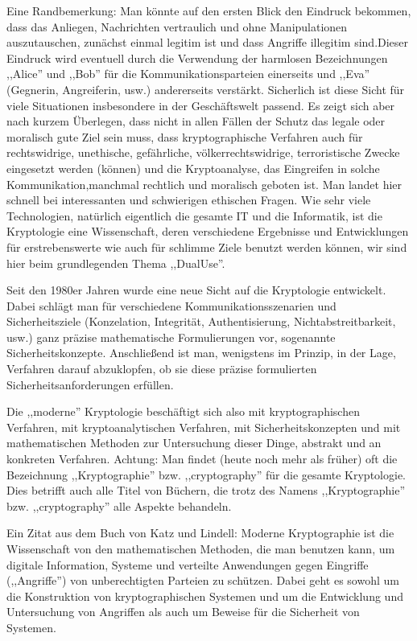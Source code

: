 \documentclass[a4paper]{article}
\begin{document}
\begin{multicols}{3}
Eine Randbemerkung: Man könnte auf den ersten Blick den Eindruck bekommen, dass das Anliegen,  Nachrichten vertraulich und ohne Manipulationen auszutauschen, zunächst einmal legitim ist und dass Angriffe illegitim sind.Dieser Eindruck wird eventuell durch die Verwendung der harmlosen Bezeichnungen ,,Alice'' und ,,Bob'' für die Kommunikationsparteien einerseits und ,,Eva'' (Gegnerin, Angreiferin, usw.) andererseits verstärkt. Sicherlich ist diese Sicht für viele Situationen insbesondere in der Geschäftswelt passend. Es zeigt sich aber nach kurzem Überlegen, dass nicht in allen Fällen der Schutz das legale oder moralisch gute Ziel sein muss, dass kryptographische Verfahren auch für rechtswidrige, unethische, gefährliche, völkerrechtswidrige, terroristische Zwecke eingesetzt werden (können) und die Kryptoanalyse, das Eingreifen in solche Kommunikation,manchmal rechtlich und moralisch geboten ist. Man landet hier schnell bei interessanten und schwierigen ethischen Fragen. Wie sehr viele Technologien, natürlich eigentlich die gesamte IT und die Informatik, ist die Kryptologie eine Wissenschaft, deren verschiedene Ergebnisse und Entwicklungen für erstrebenswerte wie auch für schlimme Ziele benutzt werden können, wir sind hier beim grundlegenden Thema ,,DualUse''.

Seit den 1980er Jahren wurde eine neue Sicht auf die Kryptologie entwickelt. Dabei schlägt man für verschiedene Kommunikationsszenarien und Sicherheitsziele (Konzelation, Integrität, Authentisierung, Nichtabstreitbarkeit, usw.) ganz präzise mathematische Formulierungen vor, sogenannte Sicherheitskonzepte. Anschließend ist man, wenigstens im Prinzip, in der Lage, Verfahren darauf abzuklopfen, ob sie diese präzise formulierten Sicherheitsanforderungen erfüllen.

Die ,,moderne'' Kryptologie beschäftigt sich also mit kryptographischen Verfahren, mit kryptoanalytischen Verfahren, mit Sicherheitskonzepten und mit mathematischen Methoden zur Untersuchung dieser Dinge, abstrakt und an konkreten Verfahren.
Achtung: Man findet (heute noch mehr als früher) oft die Bezeichnung ,,Kryptographie'' bzw. ,,cryptography'' für die gesamte Kryptologie. Dies betrifft auch alle Titel von Büchern, die trotz des Namens ,,Kryptographie'' bzw. ,,cryptography'' alle Aspekte behandeln.

Ein Zitat aus dem Buch von Katz und Lindell: Moderne Kryptographie ist die Wissenschaft von den mathematischen Methoden, die man benutzen kann, um digitale Information, Systeme und verteilte Anwendungen gegen Eingriffe (,,Angriffe'') von unberechtigten Parteien zu schützen. Dabei geht es sowohl um die Konstruktion von kryptographischen Systemen und um die Entwicklung und Untersuchung von Angriffen als auch um Beweise für die Sicherheit von Systemen. 


\end{multicols}
\end{document}
